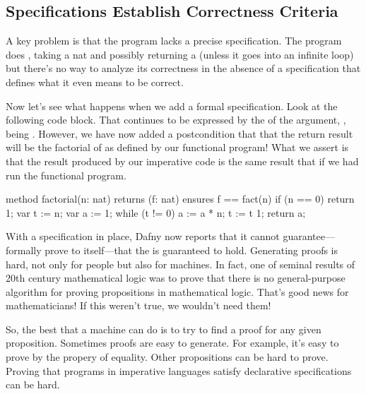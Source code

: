 \documentclass[letterpaper,10pt,english]{sphinxmanual}
\begin{document}
\subsection{Specifications Establish Correctness Criteria}
\label{\detokenize{05-putting-it-together:specifications-establish-correctness-criteria}}
A key problem is that the program lacks a precise specification. The
program does , taking a nat and possibly returning a 
(unless it goes into an infinite loop) but there’s no way to analyze
its correctness in the absence of a specification that defines what it
even means to be correct.

Now let’s see what happens when we add a formal specification.  Look
at the following code block. That  continues to be expressed
by the  of the argument, , being . However, we have now
added a postcondition that  that the return result will be
the factorial of  as defined by our functional program!  What we
assert is that the result produced by our imperative code is the same
result that  if we had run the functional
program.

\begin{sphinxVerbatim}[commandchars=\\\{\}]
method factorial(n: nat) returns (f: nat)
    ensures f == fact(n)
\PYGZob{}
    if (n == 0)
    \PYGZob{}
        return 1;
    \PYGZcb{}
    var t := n;
    var a := 1;
    while (t !=  0)
    \PYGZob{}
        a := a * n;
        t := t \PYGZhy{} 1;
    \PYGZcb{}
    return a;
\PYGZcb{}
\end{sphinxVerbatim}

With a specification in place, Dafny now reports that it cannot
guarantee—formally prove to itself—that the  is
guaranteed to hold. Generating proofs is hard, not only for people but
also for machines. In fact, one of seminal results of 20th century
mathematical logic was to prove that there is no general-purpose
algorithm for proving propositions in mathematical logic. That’s good
news for mathematicians!  If this weren’t true, we wouldn’t need them!

So, the best that a machine can do is to try to find a proof for any
given proposition. Sometimes proofs are easy to generate. For example,
it’s easy to prove  by the  propery of equality.
Other propositions can be hard to prove. Proving that programs in
imperative languages satisfy declarative specifications can be hard.
\end{document}
